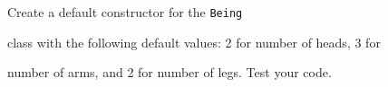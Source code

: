 Create a default constructor for the \texttt{Being}

class with the following default values: 2 for number of heads, 3 for

number of arms, and 2 for number of legs. Test your code.

